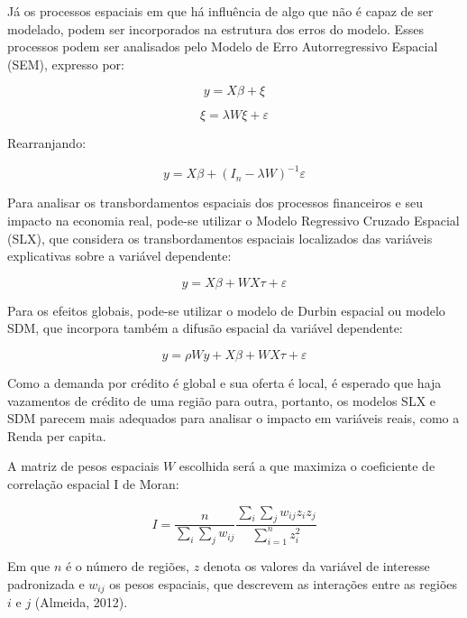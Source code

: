 \documentclass[a4paper,12pt]{article}
\begin{document}
Já os processos espaciais em que há influência de algo que não é capaz
de ser modelado, podem ser incorporados na estrutura dos erros do
modelo. Esses processos podem ser analisados pelo Modelo de Erro
Autorregressivo Espacial (SEM), expresso por:

\begin{equation}
y = X \beta + \xi
\end{equation}

\begin{equation}
\xi = \lambda W \xi + \varepsilon
\end{equation}

Rearranjando:

\begin{equation}
y = X \beta + (I_n - \lambda W)^{-1}\varepsilon
\end{equation}

Para analisar os transbordamentos espaciais dos processos financeiros e
seu impacto na economia real, pode-se utilizar o Modelo Regressivo
Cruzado Espacial (SLX), que considera os transbordamentos espaciais
localizados das variáveis explicativas sobre a variável dependente:

\begin{equation}
y = X\beta + WX \tau + \varepsilon
\end{equation}

Para os efeitos globais, pode-se utilizar o modelo de Durbin espacial ou
modelo SDM, que incorpora também a difusão espacial da variável
dependente:

\begin{equation}
y = \rho Wy + X\beta + WX \tau + \varepsilon
\end{equation}

Como a demanda por crédito é global e sua oferta é local, é esperado que
haja vazamentos de crédito de uma região para outra, portanto, os
modelos SLX e SDM parecem mais adequados para analisar o impacto em
variáveis reais, como a Renda per capita.

A matriz de pesos espaciais \(W\) escolhida será a que maximiza o
coeficiente de correlação espacial I de Moran:

\begin{equation}
I = \frac{n}{\sum_i\sum_j w_{ij}}\frac{\sum_{i}\sum_{j} w_{ij}z_i z_j}{\sum_{i=1}^n z_{i}^2}
\end{equation}

Em que \(n\) é o número de regiões, \(z\) denota os valores da variável
de interesse padronizada e \(w_{ij}\) os pesos espaciais, que descrevem
as interações entre as regiões \(i\) e \(j\) (Almeida, 2012).
\end{document}
